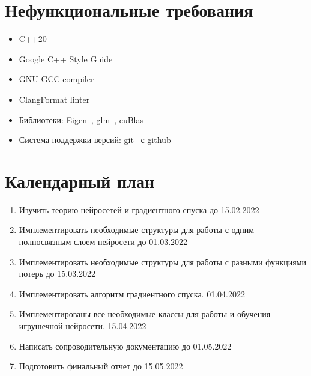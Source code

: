\documentclass{article}
\begin{document}
\section{Нефункциональные требования}

\begin{itemize}
    \item C++20~\cite{cpp}
    \item Google C++ Style Guide~\cite{styleguide}
    \item GNU GCC compiler~\cite{gcc}
    \item ClangFormat linter~\cite{clangformat}
    \item Библиотеки: Eigen~\cite{eigen}, glm~\cite{glm}, cuBlas~\cite{cublas}
    \item Система поддержки версий: git~\cite{git} с github~\cite{github}
\end{itemize}




\section{Календарный план}

\begin{enumerate}
    \item Изучить теорию нейросетей и градиентного спуска до 15.02.2022
    \item Имплементировать необходимые структуры для работы с одним полносвязным слоем нейросети до 01.03.2022
    \item Имплементировать необходимые структуры для работы с разными функциями потерь до 15.03.2022
    \item Имплементировать алгоритм градиентного спуска. 01.04.2022
    \item Имплементированы все необходимые классы для работы и обучения игрушечной нейросети. 15.04.2022
    \item Написать сопроводительную документацию до 01.05.2022
    \item Подготовить финальный отчет до 15.05.2022


\end{enumerate}
\end{document}
